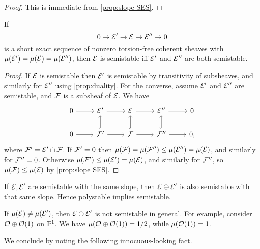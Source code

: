 \begin{proof}
    This is immediate from \cref{prop:slope SES}.
\end{proof}

\begin{proposition}
    If
    \begin{equation*}
        0\to\calE'\to\calE\to\calE''\to0
    \end{equation*}
    is a short exact sequence of nonzero torsion-free coherent sheaves with
    $\mu(\calE')=\mu(\calE)=\mu(\calE'')$, then $\calE$ is semistable iff
    $\calE'$ and $\calE''$ are both semistable.
\end{proposition}

\begin{proof}
    If $\calE$ is semistable then $\calE'$ is semistable by transitivity of
    subsheaves, and similarly for $\calE''$ using \cref{prop:duality}. For the
    converse, assume $\calE'$ and $\calE''$ are semistable, and $\calF$ is a
    subsheaf of $\calE$. We have
    \begin{equation*}
        \begin{tikzcd}
            0 \ar[r] & \calE' \ar[r] & \calE \ar[r] & \calE'' \ar[r] & 0 \\
            0 \ar[r] & \calF' \ar[r] \ar[u,hook] &
                \calF \ar[r] \ar[u,hook] & \calF'' \ar[r] \ar[u,hook] & 0,
        \end{tikzcd}
    \end{equation*}
    where $\calF'=\calE'\cap\calF$. If $\calF'=0$ then
    $\mu(\calF)=\mu(\calF'')\le\mu(\calE'')=\mu(\calE)$, and similarly for
    $\calF''=0$. Otherwise $\mu(\calF')\le\mu(\calE')=\mu(\calE)$, and similarly
    for $\calF''$, so $\mu(\calF)\le\mu(\calE)$ by \cref{prop:slope SES}.
\end{proof}

\begin{corollary}
    If $\calE,\calE'$ are semistable with the same slope, then
    $\calE\oplus\calE'$ is also semistable with that same slope. Hence
    polystable implies semistable.
\end{corollary}

\begin{remark}
    If $\mu(\calE)\ne\mu(\calE')$, then $\calE\oplus\calE'$ is not semistable in
    general. For example, consider $\O\oplus\O(1)$ on $\P^1$. We have
    $\mu(\O\oplus\O(1))=1/2$, while $\mu(\O(1))=1$.
\end{remark}

We conclude by noting the following innocuous-looking fact.

